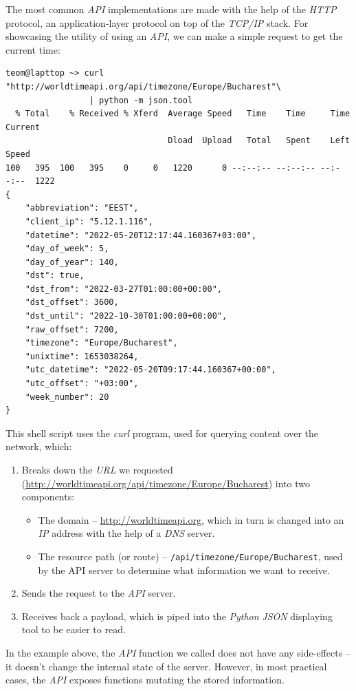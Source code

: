 \documentclass[11pt, a4paper]{report}
\def\code#1{\texttt{#1}}
\begin{document}
The most common \textit{API} implementations are made with the help of the \textit{HTTP} protocol, an application-layer protocol on top of the \textit{TCP/IP} stack. For showcasing the utility of using an \textit{API}, we can make a simple request to get the current time:

\begin{verbatim}
teom@lapttop ~> curl "http://worldtimeapi.org/api/timezone/Europe/Bucharest"\
                 | python -m json.tool
  % Total    % Received % Xferd  Average Speed   Time    Time     Time  Current
                                 Dload  Upload   Total   Spent    Left  Speed
100   395  100   395    0     0   1220      0 --:--:-- --:--:-- --:--:--  1222
{
    "abbreviation": "EEST",
    "client_ip": "5.12.1.116",
    "datetime": "2022-05-20T12:17:44.160367+03:00",
    "day_of_week": 5,
    "day_of_year": 140,
    "dst": true,
    "dst_from": "2022-03-27T01:00:00+00:00",
    "dst_offset": 3600,
    "dst_until": "2022-10-30T01:00:00+00:00",
    "raw_offset": 7200,
    "timezone": "Europe/Bucharest",
    "unixtime": 1653038264,
    "utc_datetime": "2022-05-20T09:17:44.160367+00:00",
    "utc_offset": "+03:00",
    "week_number": 20
}
\end{verbatim}

This shell script uses the \textit{curl} program, used for querying content over the network, which:
\begin{enumerate}
    \item Breaks down the \textit{URL} we requested (\url{http://worldtimeapi.org/api/timezone/Europe/Bucharest}) into two components:
    \begin{itemize}
        \item The domain -- \url{http://worldtimeapi.org}, which in turn is changed into an \textit{IP} address with the help of a \textit{DNS} server.
        \item The resource path (or route) -- \code{/api/timezone/Europe/Bucharest}, used by the API server to determine what information we want to receive.
    \end{itemize}
    \item Sends the request to the \textit{API} server.
    \item Receives back a payload, which is piped into the \textit{Python} \textit{JSON} displaying tool to be easier to read.
\end{enumerate}

In the example above, the \textit{API} function we called does not have any side-effects -- it doesn't change the internal state of the server. However, in most practical cases, the \textit{API} exposes functions mutating the stored information.
\end{document}
